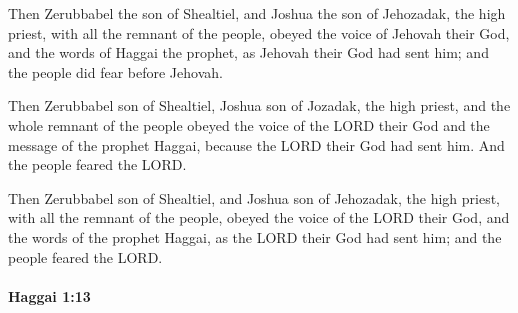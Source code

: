			\begin{versebox}
					\item[BHS] 
					\item[LXX] 
					\item[ASV] Then Zerubbabel the son of Shealtiel, and Joshua the son of Jehozadak, the high priest, with all the remnant of the people, obeyed the voice of Jehovah their God, and the words of Haggai the prophet, as Jehovah their God had sent him; and the people did fear before Jehovah.
					\item[NIV] Then Zerubbabel son of Shealtiel, Joshua son of Jozadak, the high priest, and the whole remnant of the people obeyed the voice of the LORD their God and the message of the prophet Haggai, because the LORD their God had sent him. And the people feared the LORD.
					\item[NRSV] Then Zerubbabel son of Shealtiel, and Joshua son of Jehozadak, the high priest, with all the remnant of the people, obeyed the voice of the LORD their God, and the words of the prophet Haggai, as the LORD their God had sent him; and the people feared the LORD.
			\end{versebox}

		\paragraph{Haggai 1:13} %
			\label{HAGGAI-1-13}

